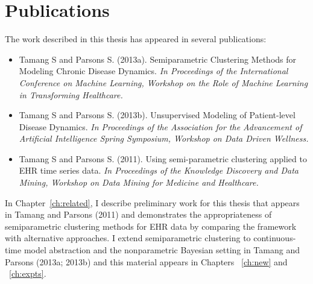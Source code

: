 \section{Publications}
The work described in this thesis has appeared in several publications:
\begin{itemize}
  \item Tamang S and Parsons S. (2013a). Semiparametric Clustering Methods for Modeling Chronic Disease Dynamics. \emph{In Proceedings of the International Conference on Machine Learning, Workshop on the Role of Machine Learning in Transforming Healthcare.}
  \item Tamang S and Parsons S. (2013b).  Unsupervised Modeling of Patient-level Disease Dynamics. \emph{In Proceedings of the Association for the Advancement of Artificial Intelligence Spring Symposium, Workshop on Data Driven Wellness.}
  \item Tamang S and Parsons S. (2011). Using semi-parametric clustering applied to EHR time series data. \emph{In Proceedings of the Knowledge Discovery and Data Mining, Workshop on Data Mining for Medicine and Healthcare.}
\end{itemize}

In Chapter~\ref{ch:related}, I describe preliminary work for this thesis that appears in Tamang and Parsons (2011) and demonstrates the appropriateness of semiparametric clustering methods for EHR data by comparing the framework with alternative approaches.  I extend semiparametric clustering to continuous-time model abstraction and the nonparametric Bayesian setting in Tamang and Parsons (2013a; 2013b) and this material appears in Chapters ~\ref{ch:new} and ~\ref{ch:expts}.




